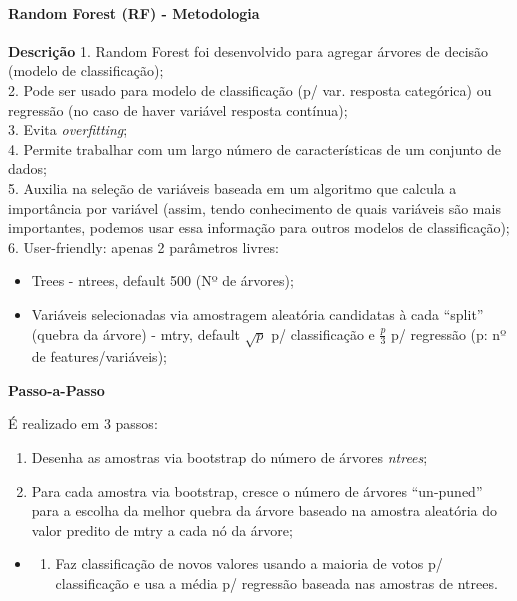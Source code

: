 \documentclass[]{article}
\providecommand{\tightlist}{%
  \setlength{\itemsep}{0pt}\setlength{\parskip}{0pt}}
\let\oldparagraph\paragraph
\renewcommand{\paragraph}[1]{\oldparagraph{#1}\mbox{}}
\begin{document}
\hypertarget{random-forest-rf---metodologia}{%
\paragraph{Random Forest (RF) -
Metodologia}\label{random-forest-rf---metodologia}}

\textbf{Descrição} 1. Random Forest foi desenvolvido para agregar
árvores de decisão (modelo de classificação);\\
2. Pode ser usado para modelo de classificação (p/ var. resposta
categórica) ou regressão (no caso de haver variável resposta
contínua);\\
3. Evita \emph{overfitting};\\
4. Permite trabalhar com um largo número de características de um
conjunto de dados;\\
5. Auxilia na seleção de variáveis baseada em um algoritmo que calcula a
importância por variável (assim, tendo conhecimento de quais variáveis
são mais importantes, podemos usar essa informação para outros modelos
de classificação);\\
6. User-friendly: apenas 2 parâmetros livres:

\begin{itemize}
\tightlist
\item
  Trees - ntrees, default 500 (Nº de árvores);
\item
  Variáveis selecionadas via amostragem aleatória candidatas à cada
  ``split'' (quebra da árvore) - mtry, default \(\sqrt{p}\) p/
  classificação e \(\frac{p}{3}\) p/ regressão (p: nº de
  features/variáveis);
\end{itemize}

\textbf{Passo-a-Passo}

É realizado em 3 passos:

\begin{enumerate}
\def\labelenumi{\arabic{enumi}.}
\tightlist
\item
  Desenha as amostras via bootstrap do número de árvores
  \emph{ntrees};\\
\item
  Para cada amostra via bootstrap, cresce o número de árvores
  ``un-puned'' para a escolha da melhor quebra da árvore baseado na
  amostra aleatória do valor predito de mtry a cada nó da árvore;\\
\end{enumerate}

\begin{itemize}
\item
  \begin{enumerate}
  \def\labelenumi{\arabic{enumi}.}
  \setcounter{enumi}{2}
  \tightlist
  \item
    Faz classificação de novos valores usando a maioria de votos p/
    classificação e usa a média p/ regressão baseada nas amostras de
    ntrees.
  \end{enumerate}
\end{itemize}
\end{document}
